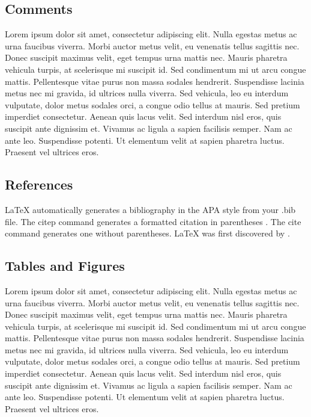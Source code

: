 \documentclass[a4paper,man,natbib,12pt]{apa6}
\begin{document}
\subsection{Comments}

Lorem ipsum dolor sit amet, consectetur adipiscing elit. Nulla egestas metus ac urna faucibus viverra. Morbi auctor metus velit, eu venenatis tellus sagittis nec. Donec suscipit maximus velit, eget tempus urna mattis nec. Mauris pharetra vehicula turpis, at scelerisque mi suscipit id. Sed condimentum mi ut arcu congue mattis. Pellentesque vitae purus non massa sodales hendrerit. Suspendisse lacinia metus nec mi gravida, id ultrices nulla viverra. Sed vehicula, leo eu interdum vulputate, dolor metus sodales orci, a congue odio tellus at mauris. Sed pretium imperdiet consectetur. Aenean quis lacus velit. Sed interdum nisl eros, quis suscipit ante dignissim et. Vivamus ac ligula a sapien facilisis semper. Nam ac ante leo. Suspendisse potenti. Ut elementum velit at sapien pharetra luctus. Praesent vel ultrices eros.

\subsection{References}

LaTeX automatically generates a bibliography in the APA style from your .bib file. The citep command generates a formatted citation in parentheses \citep{adams1995hitchhiker}. The cite command generates one without parentheses. LaTeX was first discovered by \cite{adams1995hitchhiker}.

\subsection{Tables and Figures}

Lorem ipsum dolor sit amet, consectetur adipiscing elit. Nulla egestas metus ac urna faucibus viverra. Morbi auctor metus velit, eu venenatis tellus sagittis nec. Donec suscipit maximus velit, eget tempus urna mattis nec. Mauris pharetra vehicula turpis, at scelerisque mi suscipit id. Sed condimentum mi ut arcu congue mattis. Pellentesque vitae purus non massa sodales hendrerit. Suspendisse lacinia metus nec mi gravida, id ultrices nulla viverra. Sed vehicula, leo eu interdum vulputate, dolor metus sodales orci, a congue odio tellus at mauris. Sed pretium imperdiet consectetur. Aenean quis lacus velit. Sed interdum nisl eros, quis suscipit ante dignissim et. Vivamus ac ligula a sapien facilisis semper. Nam ac ante leo. Suspendisse potenti. Ut elementum velit at sapien pharetra luctus. Praesent vel ultrices eros.


\end{document}
